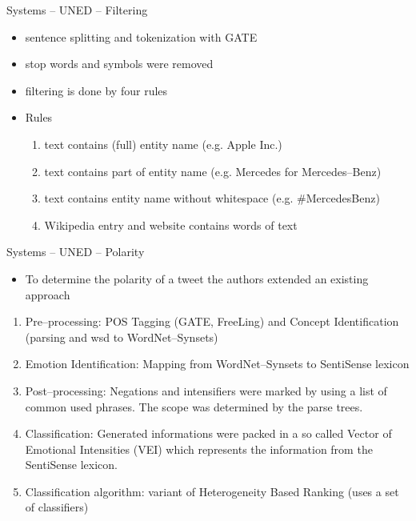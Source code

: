 \documentclass[12pt,a4paper]{beamer}
\begin{document}



\begin{frame}{Systems -- UNED -- Filtering \cite{uned}}
\begin{itemize}
\item sentence splitting and tokenization with GATE
\item stop words and symbols were removed
\item filtering is done by four rules
\end{itemize}
\begin{itemize}
\item Rules
\begin{enumerate}
\item text contains (full) entity name (e.g. Apple Inc.)
\item text contains part of entity name (e.g. Mercedes for Mercedes--Benz)
\item text contains entity name without whitespace (e.g. \#MercedesBenz)
\item Wikipedia entry and website contains words of text
\end{enumerate}
\end{itemize}
\end{frame}








\begin{frame}{Systems -- UNED -- Polarity}
\begin{itemize}
\item To determine the polarity of a tweet the authors extended an existing approach
\end{itemize}
\begin{enumerate}
\item Pre--processing: POS Tagging (GATE, FreeLing) and Concept Identification (parsing and wsd to WordNet--Synsets)
\item Emotion Identification: Mapping from WordNet--Synsets to SentiSense lexicon
\item Post--processing: Negations and intensifiers were marked by using a list of common used phrases. The scope was determined by the parse trees.
\item Classification: Generated informations were packed in a so called Vector of Emotional Intensities (VEI) which represents the information from the SentiSense lexicon.
\item Classification algorithm: variant of Heterogeneity Based Ranking (uses a set of classifiers)
\end{enumerate}

\end{frame}
\end{document}
